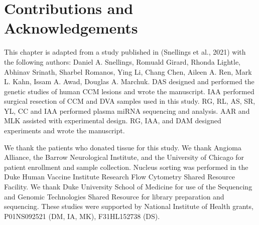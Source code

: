 \section{Contributions and Acknowledgements}
This chapter is adapted from a study published in  (Snellings et al., 2021) with the following authors: Daniel A. Snellings, Romuald Girard, Rhonda Lightle, Abhinav Srinath, Sharbel Romanos, Ying Li, Chang Chen, Aileen A. Ren, Mark L. Kahn, Issam A. Awad, Douglas A. Marchuk. DAS designed and performed the genetic studies of human CCM lesions and wrote the manuscript. IAA performed surgical resection of CCM and DVA samples used in this study. RG, RL, AS, SR, YL, CC and IAA performed plasma miRNA sequencing and analysis. AAR and MLK assisted with experimental design. RG, IAA, and DAM designed experiments and wrote the manuscript.

We thank the patients who donated tissue for this study. We thank Angioma Alliance, the Barrow Neurological Institute, and the University of Chicago for patient enrollment and sample collection. Nucleus sorting was performed in the Duke Human Vaccine Institute Research Flow Cytometry Shared Resource Facility. We thank Duke University School of Medicine for use of the Sequencing and Genomic Technologies Shared Resource for library preparation and sequencing. These studies were supported by National Institute of Health grants, P01NS092521 (DM, IA, MK), F31HL152738 (DS).
